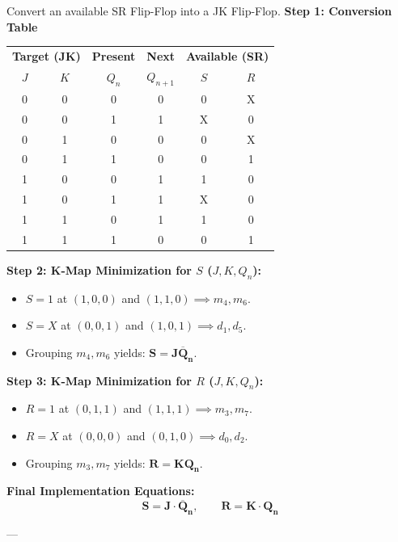 \begin{example}
Convert an available SR Flip-Flop into a JK Flip-Flop.
\tcblower
\textbf{Step 1: Conversion Table}
\begin{center}
\small
\begin{tabular}{ccc|c|cc}
\toprule
\multicolumn{2}{c}{\textbf{Target (JK)}} & \textbf{Present} & \textbf{Next} & \multicolumn{2}{c}{\textbf{Available (SR)}} \\
$J$ & $K$ & $Q_n$ & $Q_{n+1}$ & $S$ & $R$ \\
\midrule
0 & 0 & 0 & 0 & 0 & X \\
0 & 0 & 1 & 1 & X & 0 \\
0 & 1 & 0 & 0 & 0 & X \\
0 & 1 & 1 & 0 & 0 & 1 \\
1 & 0 & 0 & 1 & 1 & 0 \\
1 & 0 & 1 & 1 & X & 0 \\
1 & 1 & 0 & 1 & 1 & 0 \\
1 & 1 & 1 & 0 & 0 & 1 \\
\bottomrule
\end{tabular}
\end{center}

\textbf{Step 2: K-Map Minimization for $S$ ($J, K, Q_n$):}
\begin{itemize}
    \item $S = 1$ at $(1,0,0)$ and $(1,1,0) \implies m_4, m_6$.
    \item $S = X$ at $(0,0,1)$ and $(1,0,1) \implies d_1, d_5$.
    \item Grouping $m_4, m_6$ yields: $\mathbf{S = J\overline{Q}_n}$.
\end{itemize}

\textbf{Step 3: K-Map Minimization for $R$ ($J, K, Q_n$):}
\begin{itemize}
    \item $R = 1$ at $(0,1,1)$ and $(1,1,1) \implies m_3, m_7$.
    \item $R = X$ at $(0,0,0)$ and $(0,1,0) \implies d_0, d_2$.
    \item Grouping $m_3, m_7$ yields: $\mathbf{R = KQ_n}$.
\end{itemize}

\textbf{Final Implementation Equations:}
$$\mathbf{S = J \cdot \overline{Q}_n, \qquad R = K \cdot Q_n}$$
\end{example}

---

